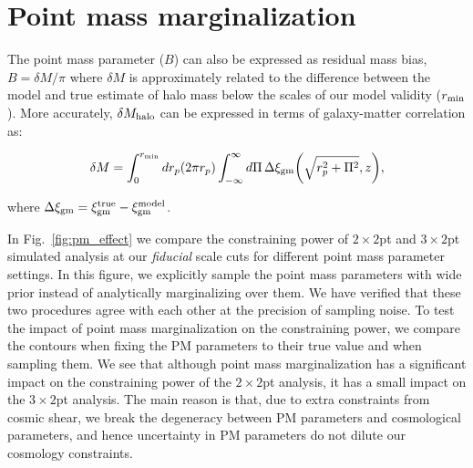 \documentclass[aps, prd,twocolumn,superscriptaddress,nofootinbib,preprintnumbers]{revtex4-1}
\begin{document}


\appendix



\section{Point mass marginalization}
\label{app:pm}
The point mass parameter ($B$) can also be expressed as residual mass bias, $B = \delta M/\pi$ where $\delta M$ is approximately related to the difference between the model and true estimate of halo mass below the scales of our model validity ($r_{\rm min}$). More accurately, $\delta M_{\rm halo}$ can be expressed in terms of galaxy-matter correlation as:
\begin{linenomath*}
\begin{equation}
\label{eq:pm_halo}
    \delta M = \int_{0}^{r_{\rm min}} dr_p (2\pi r_p) \int_{-\infty}^{\infty} d\Pi \, \Delta \xi_{\rm gm}\bigg(\sqrt{r_p^2 + \Pi^2}, z \bigg), 
\end{equation}
\end{linenomath*}
where $\Delta \xi_{\rm gm} = \xi^{\rm true}_{\rm gm} - \xi^{\rm model}_{\rm gm}$.

In Fig.~\ref{fig:pm_effect} we compare the constraining power of $2\times2$pt and $3\times2$pt simulated analysis at our \textit{fiducial} scale cuts for different point mass parameter settings. In this figure, we explicitly sample the point mass parameters with wide prior instead of analytically marginalizing over them. We have verified that these two procedures agree with each other at the precision of sampling noise. To test the impact of point mass marginalization on the constraining power, we compare the contours when fixing the PM parameters to their true value and when sampling them. We see that although point mass marginalization has a significant impact on the constraining power of the $2\times2$pt analysis, it has a small impact on the $3\times2$pt analysis. The main reason is that, due to extra constraints from cosmic shear, we break the degeneracy between PM parameters and cosmological parameters, and hence uncertainty in PM parameters do not dilute our cosmology constraints. 
\end{document}
